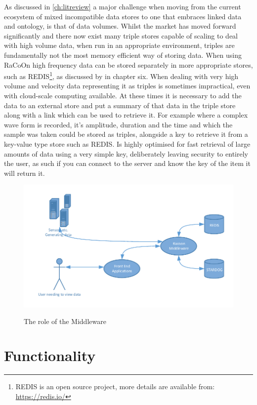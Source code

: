 As discussed in \autoref{ch:litreview} a major challenge when moving from the current ecosystem of mixed incompatible data stores to one that embraces linked data and ontology, is that of data volumes. Whilst the market has moved forward significantly and there now exist many triple stores capable of scaling to deal with high volume data, when run in an appropriate environment, triples are fundamentally not the most memory efficient way of storing data. When using RaCoOn high frequency data can be stored separately in more appropriate stores, such as REDIS\footnote{REDIS is an open source project, more details are available from: \url{https://redis.io/}}, as discussed by \citet{Tutcher2015} in chapter six. When dealing with very high volume and velocity data representing it as triples is sometimes impractical, even with cloud-scale computing available. At these times it is necessary to add the data to an external store and put a summary of that data in the triple store along with a link which can be used to retrieve it. For example where a complex wave form is recorded, it's amplitude, duration and the time and which the sample was taken could be stored as triples, alongside a key to retrieve it from a key-value type store such as REDIS. Is highly optimised for fast retrieval of large amounts of data using a very simple key, deliberately leaving security to entirely the user, as such if you can connect to the server and know the key of the item it will return it.

 \begin{figure}[!h]
\myfloatalign
{\includegraphics[width=\linewidth]{gfx/Middleware}} 
\caption{The role of the Middleware}
\label{fig:MiddlewareHighLevel}
\end{figure}

\section{Functionality}

